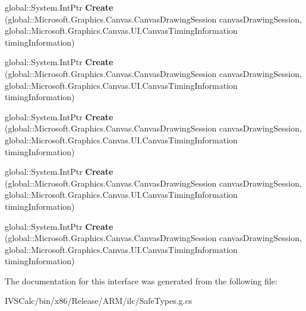 \begin{DoxyCompactItemize}
\item 
\mbox{\label{interface_microsoft_1_1_graphics_1_1_canvas_1_1_u_i_1_1_xaml_1_1_i_canvas_animated_draw_event_args_factory_ab4599e5d4847177b393a720dfb449613}} 
global\+::\+System.\+Int\+Ptr {\bfseries Create} (global\+::\+Microsoft.\+Graphics.\+Canvas.\+Canvas\+Drawing\+Session canvas\+Drawing\+Session, global\+::\+Microsoft.\+Graphics.\+Canvas.\+U\+I.\+Canvas\+Timing\+Information timing\+Information)
\item 
\mbox{\label{interface_microsoft_1_1_graphics_1_1_canvas_1_1_u_i_1_1_xaml_1_1_i_canvas_animated_draw_event_args_factory_ab4599e5d4847177b393a720dfb449613}} 
global\+::\+System.\+Int\+Ptr {\bfseries Create} (global\+::\+Microsoft.\+Graphics.\+Canvas.\+Canvas\+Drawing\+Session canvas\+Drawing\+Session, global\+::\+Microsoft.\+Graphics.\+Canvas.\+U\+I.\+Canvas\+Timing\+Information timing\+Information)
\item 
\mbox{\label{interface_microsoft_1_1_graphics_1_1_canvas_1_1_u_i_1_1_xaml_1_1_i_canvas_animated_draw_event_args_factory_ab4599e5d4847177b393a720dfb449613}} 
global\+::\+System.\+Int\+Ptr {\bfseries Create} (global\+::\+Microsoft.\+Graphics.\+Canvas.\+Canvas\+Drawing\+Session canvas\+Drawing\+Session, global\+::\+Microsoft.\+Graphics.\+Canvas.\+U\+I.\+Canvas\+Timing\+Information timing\+Information)
\item 
\mbox{\label{interface_microsoft_1_1_graphics_1_1_canvas_1_1_u_i_1_1_xaml_1_1_i_canvas_animated_draw_event_args_factory_ab4599e5d4847177b393a720dfb449613}} 
global\+::\+System.\+Int\+Ptr {\bfseries Create} (global\+::\+Microsoft.\+Graphics.\+Canvas.\+Canvas\+Drawing\+Session canvas\+Drawing\+Session, global\+::\+Microsoft.\+Graphics.\+Canvas.\+U\+I.\+Canvas\+Timing\+Information timing\+Information)
\item 
\mbox{\label{interface_microsoft_1_1_graphics_1_1_canvas_1_1_u_i_1_1_xaml_1_1_i_canvas_animated_draw_event_args_factory_ab4599e5d4847177b393a720dfb449613}} 
global\+::\+System.\+Int\+Ptr {\bfseries Create} (global\+::\+Microsoft.\+Graphics.\+Canvas.\+Canvas\+Drawing\+Session canvas\+Drawing\+Session, global\+::\+Microsoft.\+Graphics.\+Canvas.\+U\+I.\+Canvas\+Timing\+Information timing\+Information)
\end{DoxyCompactItemize}


The documentation for this interface was generated from the following file\+:\begin{DoxyCompactItemize}
\item 
I\+V\+S\+Calc/bin/x86/\+Release/\+A\+R\+M/ilc/Safe\+Types.\+g.\+cs\end{DoxyCompactItemize}
